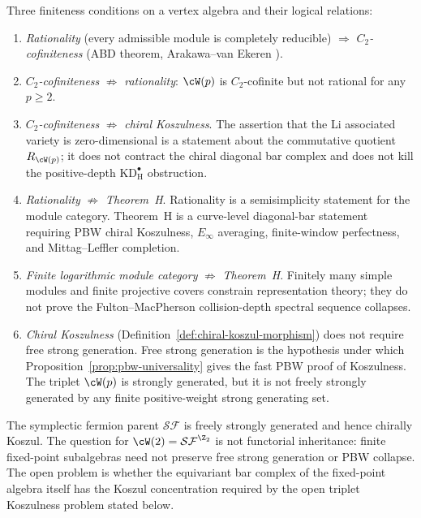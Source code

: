 \begin{remark}
\label{rem:wp-c2-vs-koszul}
Three finiteness conditions on a vertex algebra and their
logical relations:
\begin{enumerate}
\item \emph{Rationality} (every admissible module is completely
reducible) $\Longrightarrow$ \emph{$C_2$-cofiniteness} (ABD
theorem, Arakawa--van Ekeren \cite{AvE23}).
\item \emph{$C_2$-cofiniteness} $\not\Longrightarrow$
\emph{rationality}: $\cW(p)$ is $C_2$-cofinite but not
rational for any $p \geq 2$.
\item \emph{$C_2$-cofiniteness} $\not\Longrightarrow$
\emph{chiral Koszulness}.  The assertion that the Li associated
variety is zero-dimensional is a statement about the commutative
quotient $R_{\cW(p)}$; it does not contract the chiral diagonal bar
complex and does not kill the positive-depth
$\mathrm{KD}_{\mathrm H}^{\bullet}$ obstruction.
\item \emph{Rationality} $\not\Longrightarrow$ \emph{Theorem~H}.
Rationality is a semisimplicity statement for the module category.
Theorem~H is a curve-level diagonal-bar statement requiring PBW
chiral Koszulness, $E_\infty$ averaging, finite-window perfectness,
and Mittag--Leffler completion.
\item \emph{Finite logarithmic module category} $\not\Longrightarrow$
\emph{Theorem~H}.  Finitely many simple modules and finite
projective covers constrain representation theory; they do not prove
the Fulton--MacPherson collision-depth spectral sequence collapses.
\item \emph{Chiral Koszulness}
(Definition~\ref{def:chiral-koszul-morphism}) does not require
free strong generation. Free strong generation is the hypothesis
under which Proposition~\ref{prop:pbw-universality} gives the
fast PBW proof of Koszulness. The triplet $\cW(p)$ is strongly
generated, but it is not freely strongly generated by any finite
positive-weight strong generating set.
\end{enumerate}
The symplectic fermion parent $\mathcal{SF}$ is freely
strongly generated and hence chirally Koszul. The question for
$\cW(2) = \mathcal{SF}^{\Z_2}$ is not functorial inheritance:
finite fixed-point subalgebras need not preserve free strong
generation or PBW collapse. The open problem is whether the
equivariant bar complex of the fixed-point algebra itself has
the Koszul concentration required by
the open triplet Koszulness problem stated below.
\end{remark}

